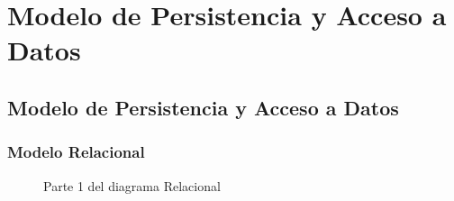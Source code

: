 \chapter{Modelo de Persistencia y Acceso a Datos}
\label{cap:persistencia}
\section{Modelo de Persistencia y Acceso a Datos}

\subsection{Modelo Relacional}
    
    \begin{figure}[htbp!]
    	\begin{center}
    		\caption{Parte 1 del diagrama Relacional}
    		\label{fig:diag1}
    	\end{center}
    \end{figure}
